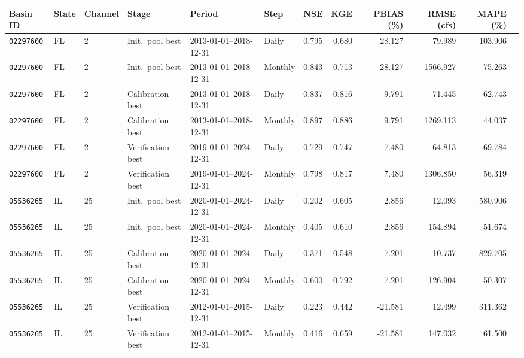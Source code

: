 \begin{tabular}{@{}lllllllrrrrr@{}}
\toprule
Basin ID & State & Channel & Stage & Period & Step & NSE & KGE & PBIAS (\%) & RMSE (cfs) & MAPE (\%) \\
\midrule
\texttt{02297600} & FL & 2 & Init.\ pool best & 2013-01-01--2018-12-31 & Daily & 0.795 & 0.680 & 28.127 & 79.989 & 103.906 \\
\texttt{02297600} & FL & 2 & Init.\ pool best & 2013-01-01--2018-12-31 & Monthly & 0.843 & 0.713 & 28.127 & 1566.927 & 75.263 \\
\texttt{02297600} & FL & 2 & Calibration best & 2013-01-01--2018-12-31 & Daily & 0.837 & 0.816 & 9.791 & 71.445 & 62.743 \\
\texttt{02297600} & FL & 2 & Calibration best & 2013-01-01--2018-12-31 & Monthly & 0.897 & 0.886 & 9.791 & 1269.113 & 44.037 \\
\texttt{02297600} & FL & 2 & Verification best & 2019-01-01--2024-12-31 & Daily & 0.729 & 0.747 & 7.480 & 64.813 & 69.784 \\
\texttt{02297600} & FL & 2 & Verification best & 2019-01-01--2024-12-31 & Monthly & 0.798 & 0.817 & 7.480 & 1306.850 & 56.319 \\
\texttt{05536265} & IL & 25 & Init.\ pool best & 2020-01-01--2024-12-31 & Daily & 0.202 & 0.605 & 2.856 & 12.093 & 580.906 \\
\texttt{05536265} & IL & 25 & Init.\ pool best & 2020-01-01--2024-12-31 & Monthly & 0.405 & 0.610 & 2.856 & 154.894 & 51.674 \\
\texttt{05536265} & IL & 25 & Calibration best & 2020-01-01--2024-12-31 & Daily & 0.371 & 0.548 & -7.201 & 10.737 & 829.705 \\
\texttt{05536265} & IL & 25 & Calibration best & 2020-01-01--2024-12-31 & Monthly & 0.600 & 0.792 & -7.201 & 126.904 & 50.307 \\
\texttt{05536265} & IL & 25 & Verification best & 2012-01-01--2015-12-31 & Daily & 0.223 & 0.442 & -21.581 & 12.499 & 311.362 \\
\texttt{05536265} & IL & 25 & Verification best & 2012-01-01--2015-12-31 & Monthly & 0.416 & 0.659 & -21.581 & 147.032 & 61.500 \\
\bottomrule
\end{tabular}
